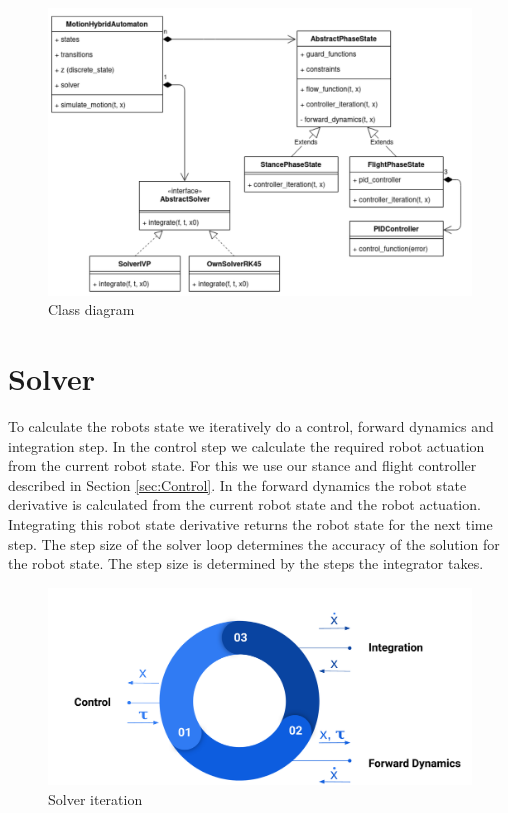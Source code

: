 \documentclass[10pt,conference]{IEEEtran}
\begin{document}
\begin{figure}[h]
   \centering
   \includegraphics[scale=0.17]{"assets/class_structure.png"}
   \caption{Class diagram}
   \label{fig:class_diagram}
\end{figure}

\section{Solver}
\label{sec:Solver}
To calculate the robots state we iteratively do a control, forward dynamics and integration step. In the control step we calculate the required robot actuation from 
the current robot state. For this we use our stance and flight controller described in Section \ref{sec:Control}. In the forward dynamics the robot state derivative 
is calculated from the current robot state and the robot actuation. Integrating this robot state derivative returns the robot state for the next time step. The step size 
of the solver loop determines the accuracy of the solution for the robot state. The step size is determined by the steps the integrator takes.


\begin{figure}[h]
   \centering
   \includegraphics[scale=0.12]{"assets/solver_iteration.png"}
   \caption{Solver iteration}
   \label{fig:solver_iteration}
\end{figure}
\end{document}

